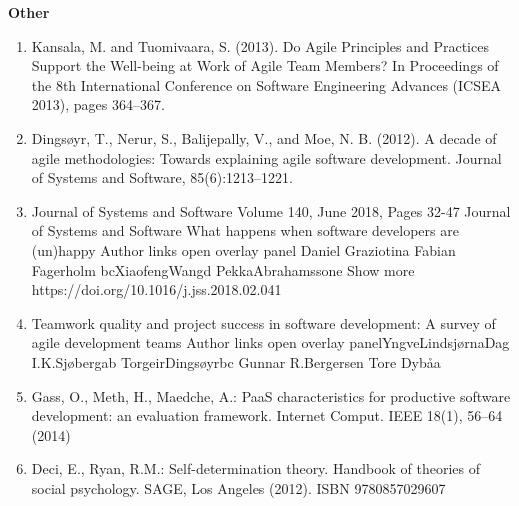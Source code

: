 \documentclass[english, 12pt, a4paper, sci, utf8, a-1b, online]{aaltothesis}
\begin{document}
\textbf{Other}
\begin{enumerate}
  \item Kansala, M. and Tuomivaara, S. (2013). Do Agile Principles and Practices Support the Well-being at Work of Agile Team Members? In Proceedings of the 8th International Conference on Software Engineering Advances (ICSEA 2013), pages 364–367.
  \item Dingsøyr, T., Nerur, S., Balijepally, V., and Moe, N. B. (2012). A decade of agile methodologies: Towards explaining agile software development. Journal of Systems and Software, 85(6):1213–1221.
  \item Journal of Systems and Software Volume 140, June 2018, Pages 32-47 Journal of Systems and Software What happens when software developers are (un)happy Author links open overlay panel Daniel Graziotina Fabian Fagerholm bcXiaofengWangd PekkaAbrahamssone Show more https://doi.org/10.1016/j.jss.2018.02.041
  \item Teamwork quality and project success in software development: A survey of agile development teams Author links open overlay panelYngveLindsjørnaDag I.K.Sjøbergab TorgeirDingsøyrbc Gunnar R.Bergersen Tore Dybåa
  \item Gass, O., Meth, H., Maedche, A.: PaaS characteristics for productive software development: an evaluation framework. Internet Comput. IEEE 18(1), 56–64 (2014)
  \item Deci, E., Ryan, R.M.: Self-determination theory. Handbook of theories of social psychology. SAGE, Los Angeles (2012). ISBN 9780857029607
\end{enumerate}

\clearpage
\thesisbibliography


\end{document}
